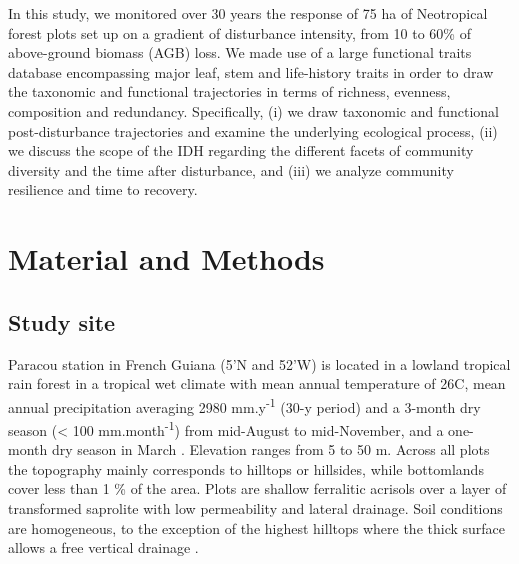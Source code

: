\documentclass[fleqn,10pt]{ArtEcoFoG} %
\begin{document}
In this study, we monitored over 30 years the response of 75 ha of
Neotropical forest plots set up on a gradient of disturbance intensity,
from 10 to 60\% of above-ground biomass (AGB) loss. We made use of a
large functional traits database encompassing major leaf, stem and
life-history traits in order to draw the taxonomic and functional
trajectories in terms of richness, evenness, composition and redundancy.
Specifically, (i) we draw taxonomic and functional post-disturbance
trajectories and examine the underlying ecological process, (ii) we
discuss the scope of the IDH regarding the different facets of community
diversity and the time after disturbance, and (iii) we analyze community
resilience and time to recovery.

\section{Material and Methods}\label{material-and-methods}

\subsection{Study site}\label{study-site}

Paracou station in French Guiana (5'N and
52'W) is located in a lowland tropical rain forest in a
tropical wet climate with mean annual temperature of 26\textdegree C,
mean annual precipitation averaging 2980 mm.y\textsuperscript{-1} (30-y
period) and a 3-month dry season (\textless{} 100
mm.month\textsuperscript{-1}) from mid-August to mid-November, and a
one-month dry season in March \citep{Wagner2011}. Elevation ranges from
5 to 50 m. Across all plots the topography mainly corresponds to
hilltops or hillsides, while bottomlands cover less than 1 \% of the
area. Plots are shallow ferralitic acrisols over a layer of transformed
saprolite with low permeability and lateral drainage. Soil conditions
are homogeneous, to the exception of the highest hilltops where the
thick surface allows a free vertical drainage
\citep{Gourlet-Fleury2004}.
\end{document}
